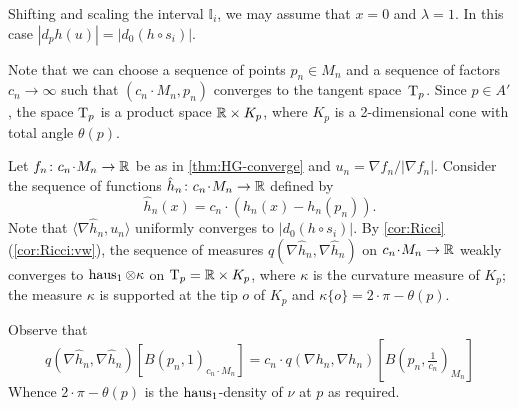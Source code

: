 Shifting and scaling the interval $\mathbb{I}_i$, we may assume that $x=0$ and $\lambda=1$.
In this case $|d_ph(u)|=|d_0(h\circ s_i)|$.

Note that we can choose a sequence of points $p_n\in M_n$ and a sequence of factors $c_n\to \infty$ such that $(c_n\cdot M_n,p_n)$ converges to the tangent space~$\mathrm{T}_p$.
Since $p\in A'$, the space $\mathrm{T}_p$ is a product space $\mathbb{R}\times K_p$, where $K_p$ is a 2-dimensional cone with total angle $\theta(p)$.

Let $f_n\:c_n\cdot M_n\to \RR$ be as in \ref{thm:HG-converge} and $u_n=\nabla f_n/|\nabla f_n|$.
Consider the sequence of functions $\hat h_n\:c_n\cdot M_n\to \RR$ defined by 
\[\hat h_n(x)=c_n\cdot(h_n(x)-h_n(p_n)).\]
Note that $\langle\nabla \hat h_n,u_n\rangle$ uniformly converges to  $|d_0(h\circ s_i)|$.
By \ref{cor:Ricci}(\ref{cor:Ricci:vw}), the sequence of measures $q(\nabla\hat h_n, \nabla\hat h_n)$ on $c_n\cdot M_n\to \RR$ weakly converges to $\operatorname{\rm haus}_1\otimes\kappa $ on $\T_p\zz=\RR\times K_p$, 
where $\kappa$ is the curvature measure of $K_p$; 
the measure $\kappa$ is supported at the tip $o$ of $K_p$
and $\kappa\{o\}=2\cdot \pi-\theta(p)$.

Observe that 
\[q(\nabla\hat h_n, \nabla\hat h_n)[B(p_n,1)_{c_n\cdot M_n}]
=
c_n\cdot q(\nabla h_n, \nabla h_n)[B(p_n,\tfrac1{c_n})_{M_n}]\]
Whence $2\cdot \pi-\theta(p)$ is the $\operatorname{\rm haus}_1$-density of $\nu$ at $p$ as required.
\qeds
